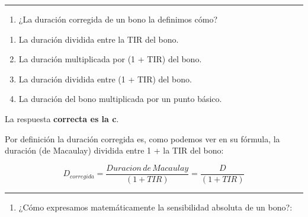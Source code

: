 \documentclass[
  letterpaper,
  DIV=11,
  numbers=noendperiod]{scrreprt}
\providecommand{\tightlist}{%
  \setlength{\itemsep}{0pt}\setlength{\parskip}{0pt}}\usepackage{longtable,booktabs,array}
\begin{document}
\begin{center}\rule{0.5\linewidth}{0.5pt}\end{center}

\begin{enumerate}
\def\labelenumi{\arabic{enumi}.}
\setcounter{enumi}{56}
\tightlist
\item
  ¿La duración corregida de un bono la definimos cómo?
\end{enumerate}

\begin{enumerate}
\def\labelenumi{\alph{enumi}.}
\item
  La duración dividida entre la TIR del bono.
\item
  La duración multiplicada por (1 + TIR) del bono.
\item
  La duración dividida entre (1 + TIR) del bono.
\item
  La duración del bono multiplicada por un punto básico.
\end{enumerate}

\begin{tcolorbox}[enhanced jigsaw, left=2mm, opacityback=0, colback=white, breakable, arc=.35mm, bottomrule=.15mm, rightrule=.15mm, toprule=.15mm, leftrule=.75mm, colframe=quarto-callout-tip-color-frame]
\begin{minipage}[t]{5.5mm}
\textcolor{quarto-callout-tip-color}{\faLightbulb}
\end{minipage}%
\begin{minipage}[t]{\textwidth - 5.5mm}

La respuesta \textbf{correcta es la c}.

Por definición la duración corregida es, como podemos ver en su fórmula,
la duración (de Macaulay) dividida entre 1 + la TIR del bono:

\[D_{corregida}=\frac{Duracion\,de\, Macaulay}{\left(1+TIR\right)}=\frac{D}{\left(1+TIR\right)} \]

\end{minipage}%
\end{tcolorbox}

\begin{center}\rule{0.5\linewidth}{0.5pt}\end{center}

\begin{enumerate}
\def\labelenumi{\arabic{enumi}.}
\setcounter{enumi}{57}
\tightlist
\item
  ¿Cómo expresamos matemáticamente la sensibilidad absoluta de un bono?:
\end{enumerate}
\end{document}

